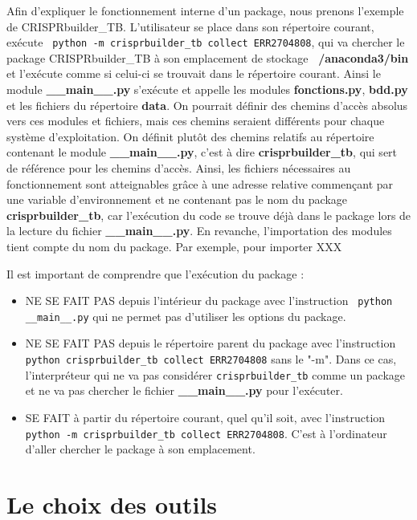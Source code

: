 \documentclass[twoside,a4paper,11pt,frenchb,openany]{report}
\begin{document}
Afin d'expliquer le fonctionnement interne d'un package, nous prenons l'exemple de CRISPRbuilder\_TB. L'utilisateur se place dans son répertoire courant, exécute \texttt{  python -m crisprbuilder\_tb \textemdash \textemdash collect ERR2704808}, qui va chercher le package CRISPRbuilder\_TB à son emplacement de stockage \textbf{~/anaconda3/bin} et l'exécute comme si celui-ci se trouvait dans le répertoire courant. Ainsi le module \textbf{\_\_main\_\_.py} s'exécute et appelle les modules \textbf{fonctions.py}, \textbf{bdd.py} et les fichiers du répertoire \textbf{data}. On pourrait définir des chemins d'accès absolus vers ces modules et fichiers, mais ces chemins seraient différents pour chaque système d'exploitation. On définit plutôt des chemins relatifs au répertoire contenant le module \textbf{\_\_main\_\_.py}, c'est à dire \textbf{crisprbuilder\_tb}, qui sert de référence pour les chemins d'accès. Ainsi, les fichiers nécessaires au fonctionnement sont atteignables grâce à une adresse relative commençant par une variable d'environnement et ne contenant pas le nom du package \textbf{crisprbuilder\_tb}, car l'exécution du code se trouve déjà dans le package lors de la lecture du fichier \textbf{\_\_main\_\_.py}. En revanche, l'importation des modules tient compte du nom du package. Par exemple, pour importer XXX

Il est important de comprendre que l'exécution du package :
\begin{itemize}
\item NE SE FAIT PAS depuis l'intérieur du package avec l'instruction \texttt{  python \_\_main\_\_.py} qui ne permet pas d'utiliser les options du package.
\item NE SE FAIT PAS depuis le répertoire parent du package avec l'instruction \texttt{  python crisprbuilder\_tb \textemdash \textemdash collect ERR2704808} sans le "-m". Dans ce cas, l'interpréteur qui ne va pas considérer \texttt{crisprbuilder\_tb} comme un package et ne va pas chercher le fichier \textbf{\_\_main\_\_.py} pour l'exécuter.
\item SE FAIT à partir du répertoire courant, quel qu'il soit, avec l'instruction \texttt{  python -m crisprbuilder\_tb \textemdash \textemdash collect ERR2704808}. C'est à l'ordinateur d'aller chercher le package à son emplacement. 
\end{itemize}




\chapter{Le choix des outils}
\end{document}
